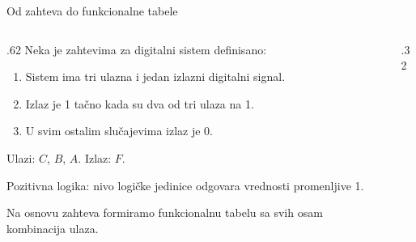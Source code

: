 \begin{frame}[label=02-s011]{Od zahteva do funkcionalne tabele}
\begin{columns}[T,onlytextwidth]
\begin{column}{.62\textwidth}
Neka je zahtevima za digitalni sistem definisano:
\par\vspace{2mm}
\begin{enumerate}
\item Sistem ima tri ulazna i jedan izlazni digitalni signal.
\item Izlaz je 1 tačno kada su \alert{dva od tri ulaza} na 1.
\item U svim ostalim slučajevima izlaz je 0.
\end{enumerate}
\par\vspace{3mm}
\par\vspace{1mm}
Ulazi: \(C\), \(B\), \(A\). Izlaz: \(F\).\par
Pozitivna logika: nivo logičke jedinice odgovara vrednosti promenljive 1.
\par\vspace{3mm}
Na osnovu zahteva formiramo funkcionalnu tabelu sa svih osam kombinacija ulaza.
\end{column}
\begin{column}{.32\textwidth}\centering
{}\par\vspace{3mm}
{\fontsize{9}{11}\selectfont }
\end{column}
\end{columns}
\end{frame}
